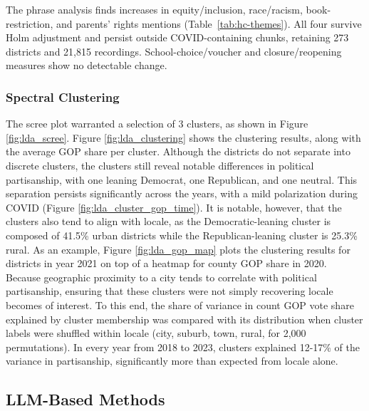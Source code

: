\documentclass[12pt]{article}
\begin{document}
The phrase analysis finds increases in equity/inclusion,
race/racism, book-restriction, and parents' rights mentions
(Table~\ref{tab:hc-themes}). All four survive Holm adjustment
and persist outside COVID-containing chunks, retaining 273
districts and 21,815 recordings. School-choice/voucher and
closure/reopening measures show no detectable change. 

\subsubsection{Spectral Clustering}
The scree plot warranted a selection of 3 clusters, as shown in Figure \ref{fig:lda_scree}. Figure \ref{fig:lda_clustering} shows the clustering results, along with the average GOP share per cluster. Although the districts do not separate into discrete clusters, the clusters still reveal notable differences in political partisanship, with one leaning Democrat, one Republican, and one neutral. This separation persists significantly across the years, with a mild polarization during COVID (Figure \ref{fig:lda_cluster_gop_time}). It is notable, however, that the clusters also tend to align with locale, as the Democratic-leaning cluster is composed of 41.5\% urban districts while the Republican-leaning cluster is 25.3\% rural. As an example, Figure \ref{fig:lda_gop_map} plots the clustering results for districts in year 2021 on top of a heatmap for county GOP share in 2020. Because geographic proximity to a city tends to correlate with political partisanship, ensuring that these clusters were not simply recovering locale becomes of interest. To this end, the share of variance in count GOP vote share explained by cluster membership was compared with its distribution when cluster labels were shuffled within locale (city, suburb, town, rural, for 2,000 permutations). In every year from 2018 to 2023, clusters explained 12-17\% of the variance in partisanship, significantly more than expected from locale alone.

\subsection{LLM-Based Methods}\label{sec:r-llm}
\end{document}
